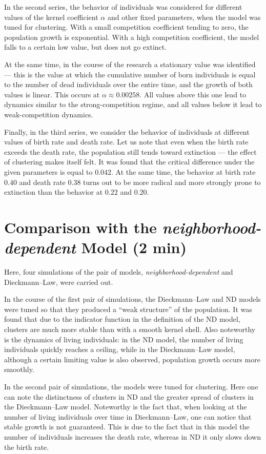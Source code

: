 \documentclass[12pt,a4paper]{article}
\begin{document}
In the second series, the behavior of individuals was considered for different values of the kernel coefficient $\alpha$ and other fixed parameters, when the model was tuned for clustering. With a small competition coefficient tending to zero, the population growth is exponential. With a high competition coefficient, the model falls to a certain low value, but does not go extinct.

At the same time, in the course of the research a stationary value was identified --- this is the value at which the cumulative number of born individuals is equal to the number of dead individuals over the entire time, and the growth of both values is linear. This occurs at $\alpha \approx 0.00258$. All values above this one lead to dynamics similar to the strong-competition regime, and all values below it lead to weak-competition dynamics.

Finally, in the third series, we consider the behavior of individuals at different values of birth rate and death rate. Let us note that even when the birth rate exceeds the death rate, the population still tends toward extinction --- the effect of clustering makes itself felt. It was found that the critical difference under the given parameters is equal to $0.042$. At the same time, the behavior at birth rate $0.40$ and death rate $0.38$ turns out to be more radical and more strongly prone to extinction than the behavior at $0.22$ and $0.20$.

\section*{Comparison with the \textit{neighborhood-dependent} Model (2 min)}
Here, four simulations of the pair of models, \textit{neighborhood-dependent} and Dieckmann--Law, were carried out.

In the course of the first pair of simulations, the Dieckmann--Law and ND models were tuned so that they produced a ``weak structure'' of the population. It was found that due to the indicator function in the definition of the ND model, clusters are much more stable than with a smooth kernel shell. Also noteworthy is the dynamics of living individuals: in the ND model, the number of living individuals quickly reaches a ceiling, while in the Dieckmann--Law model, although a certain limiting value is also observed, population growth occurs more smoothly.

In the second pair of simulations, the models were tuned for clustering. Here one can note the distinctness of clusters in ND and the greater spread of clusters in the Dieckmann--Law model. Noteworthy is the fact that, when looking at the number of living individuals over time in Dieckmann--Law, one can notice that stable growth is not guaranteed. This is due to the fact that in this model the number of individuals increases the death rate, whereas in ND it only slows down the birth rate.
\end{document}
